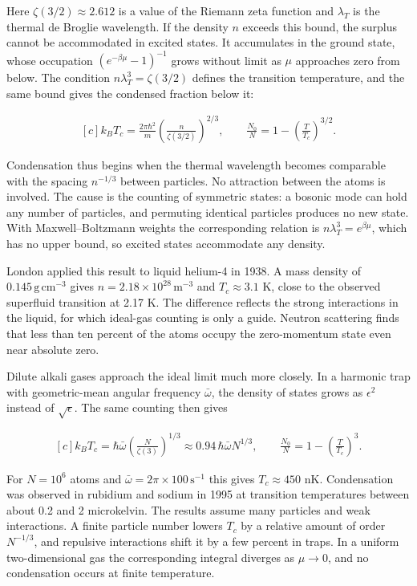 \documentclass[11pt,oneside]{book}
\newenvironment{centeredalign}{\[\begin{gathered}[c]}{\end{gathered}\]}
\begin{document}
Here \(\zeta(3/2)\approx2.612\) is a value of the Riemann zeta function and \(\lambda_T\) is the thermal de Broglie wavelength. If the density \(n\) exceeds this bound, the surplus cannot be accommodated in excited states. It accumulates in the ground state, whose occupation \((e^{-\beta\mu}-1)^{-1}\) grows without limit as \(\mu\) approaches zero from below. The condition \(n\lambda_T^3=\zeta(3/2)\) defines the transition temperature, and the same bound gives the condensed fraction below it:

\begin{centeredalign}
k_BT_c=\frac{2\pi\hbar^2}{m}\left(\frac{n}{\zeta(3/2)}\right)^{2/3},\qquad
\frac{N_0}{N}=1-\left(\frac{T}{T_c}\right)^{3/2}.
\end{centeredalign}

Condensation thus begins when the thermal wavelength becomes comparable with the spacing \(n^{-1/3}\) between particles. No attraction between the atoms is involved. The cause is the counting of symmetric states: a bosonic mode can hold any number of particles, and permuting identical particles produces no new state. With Maxwell--Boltzmann weights the corresponding relation is \(n\lambda_T^3=e^{\beta\mu}\), which has no upper bound, so excited states accommodate any density.

London applied this result to liquid helium-4 in 1938. A mass density of \(0.145\,\mathrm{g\,cm^{-3}}\) gives \(n=2.18\times10^{28}\,\mathrm{m^{-3}}\) and \(T_c\approx3.1\) K, close to the observed superfluid transition at 2.17 K. The difference reflects the strong interactions in the liquid, for which ideal-gas counting is only a guide. Neutron scattering finds that less than ten percent of the atoms occupy the zero-momentum state even near absolute zero.

Dilute alkali gases approach the ideal limit much more closely. In a harmonic trap with geometric-mean angular frequency \(\bar\omega\), the density of states grows as \(\epsilon^2\) instead of \(\sqrt\epsilon\). The same counting then gives

\begin{centeredalign}
k_BT_c=\hbar\bar\omega\left(\frac{N}{\zeta(3)}\right)^{1/3}
\approx0.94\,\hbar\bar\omega N^{1/3},\qquad
\frac{N_0}{N}=1-\left(\frac{T}{T_c}\right)^3.
\end{centeredalign}

For \(N=10^6\) atoms and \(\bar\omega=2\pi\times100\,\mathrm{s^{-1}}\) this gives \(T_c\approx450\) nK. Condensation was observed in rubidium and sodium in 1995 at transition temperatures between about 0.2 and 2 microkelvin. The results assume many particles and weak interactions. A finite particle number lowers \(T_c\) by a relative amount of order \(N^{-1/3}\), and repulsive interactions shift it by a few percent in traps. In a uniform two-dimensional gas the corresponding integral diverges as \(\mu\to0\), and no condensation occurs at finite temperature.
\end{document}
